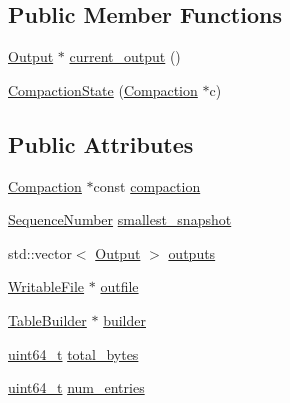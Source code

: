 \subsection*{Public Member Functions}
\begin{DoxyCompactItemize}
\item 
\hyperlink{structleveldb_1_1_d_b_impl_1_1_compaction_state_1_1_output}{Output} $\ast$ \hyperlink{structleveldb_1_1_d_b_impl_1_1_compaction_state_ac371d4a1422f4c1c122cfd39e97a6b95}{current\+\_\+output} ()
\item 
\hyperlink{structleveldb_1_1_d_b_impl_1_1_compaction_state_a3f66a31afd7f73ef5021337d1ec626b6}{Compaction\+State} (\hyperlink{classleveldb_1_1_compaction}{Compaction} $\ast$c)
\end{DoxyCompactItemize}
\subsection*{Public Attributes}
\begin{DoxyCompactItemize}
\item 
\hyperlink{classleveldb_1_1_compaction}{Compaction} $\ast$const \hyperlink{structleveldb_1_1_d_b_impl_1_1_compaction_state_a6b92e9f2249d5977b4801bdf47afed28}{compaction}
\item 
\hyperlink{namespaceleveldb_a5481ededd221c36d652c371249f869fa}{Sequence\+Number} \hyperlink{structleveldb_1_1_d_b_impl_1_1_compaction_state_a725f0984b8372c51691d72f66672dc89}{smallest\+\_\+snapshot}
\item 
std\+::vector$<$ \hyperlink{structleveldb_1_1_d_b_impl_1_1_compaction_state_1_1_output}{Output} $>$ \hyperlink{structleveldb_1_1_d_b_impl_1_1_compaction_state_acce338739aafdfa40083ae3d5aacf24a}{outputs}
\item 
\hyperlink{classleveldb_1_1_writable_file}{Writable\+File} $\ast$ \hyperlink{structleveldb_1_1_d_b_impl_1_1_compaction_state_a4c8e3de65efc30fdf33197d544a466f9}{outfile}
\item 
\hyperlink{classleveldb_1_1_table_builder}{Table\+Builder} $\ast$ \hyperlink{structleveldb_1_1_d_b_impl_1_1_compaction_state_a5335b9d45bc03378219e3fbc366fce21}{builder}
\item 
\hyperlink{stdint_8h_aaa5d1cd013383c889537491c3cfd9aad}{uint64\+\_\+t} \hyperlink{structleveldb_1_1_d_b_impl_1_1_compaction_state_a21aa7304978dffc6841c4c11761f4b71}{total\+\_\+bytes}
\item 
\hyperlink{stdint_8h_aaa5d1cd013383c889537491c3cfd9aad}{uint64\+\_\+t} \hyperlink{structleveldb_1_1_d_b_impl_1_1_compaction_state_af9f7e6ad344e85fbd97e12098c47fa5f}{num\+\_\+entries}
\end{DoxyCompactItemize}


